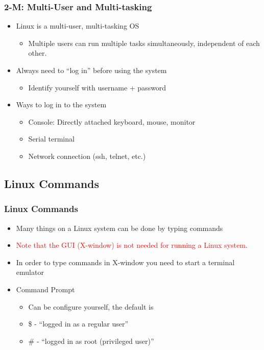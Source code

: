 \documentclass[red]{beamer}
\begin{document}
\begin{CJK*}{GBK}{kai}
\begin{frame}
\frametitle{2-M: Multi-User and Multi-tasking}
\begin{itemize}
    \item Linux is a multi-user, multi-tasking OS
    \begin{itemize}
        \item Multiple users can run multiple tasks simultaneously, independent 
			of each other.
    \end{itemize}
    \item Always need to ``log in'' before using the system
    \begin{itemize}
        \item Identify yourself with username + password
    \end{itemize}
    \item Ways to log in to the system
    \begin{itemize}
        \item Console: Directly attached keyboard, mouse, monitor
        \item Serial terminal
        \item Network connection (ssh, telnet, etc.)
    \end{itemize}
\end{itemize}
\end{frame}

\subsection{Linux Commands}
\begin{frame}
\frametitle{Linux Commands}
\begin{itemize}
    \item Many things on a Linux system can be done by typing commands
    \item \textcolor{red}{Note that the GUI (X-window) is not needed for running a Linux system.}
    \item In order to type commands in X-window you need to start a terminal emulator
    \item Command Prompt
    \begin{itemize}
        \item Can be configure yourself, the default is
        \item \$ - ``logged in as a regular user''
        \item \# - ``logged in as root (privileged user)''
    \end{itemize}
\end{itemize}
\end{frame}


\end{CJK*}
\end{document}
